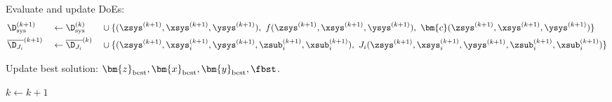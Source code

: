 \begin{algorithm}[H]
{    Evaluate and update DoEs:\vspace{-.25cm}
    \begin{alignat*}{6}
      &\D_\text{sys}^{(k+1)}&&\gets\D_\text{sys}^{(k)}&&\cup\{
        (
          \zsys^{(k+1)},
          \xsys^{(k+1)},
          \ysys^{(k+1)}
        ),~
        f(
          \zsys^{(k+1)},
          \xsys^{(k+1)},
          \ysys^{(k+1)}
        ),~\bm{c}(
          \zsys^{(k+1)},
          \xsys^{(k+1)},
          \ysys^{(k+1)}
        )
      \}\\
      &\overline{\D_{J_i}}^{(k+1)}&&\gets\overline{\D_{J_i}}^{(k)}&&\cup\{
        {(
            \zsys^{(k+1)},
            \xsys_i^{(k+1)},
            \ysys^{(k+1)},
            \zsub_i^{(k+1)},
            \xsub_i^{(k+1)}
        )},~J_i{(
            \zsys^{(k+1)},
            \xsys_i^{(k+1)},
            \ysys^{(k+1)},
            \zsub_i^{(k+1)},
            \xsub_i^{(k+1)}
        )}
      \}
    \end{alignat*}\vspace{-.5cm}

    Update best solution: \(\bm{z}_\text{best}, \bm{x}_\text{best}, \bm{y}_\text{best}, \fbst\).

    \(k \gets k + 1\)
  }

\end{algorithm}
